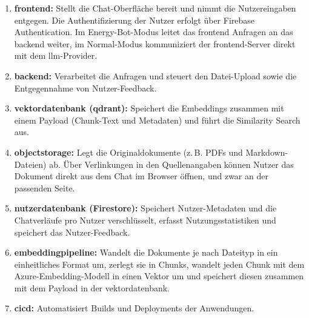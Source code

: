 \begin{enumerate}
    \item \textbf{\gls{frontend}:} Stellt die Chat-Oberfläche bereit und nimmt die Nutzereingaben entgegen. Die Authentifizierung der Nutzer erfolgt über Firebase Authentication. Im Energy-Bot-Modus leitet das \gls{frontend} Anfragen an das \gls{backend} weiter, im Normal-Modus kommuniziert der \gls{frontend}-Server direkt mit dem \ac{llm}-Provider.
    \item \textbf{\gls{backend}:} Verarbeitet die Anfragen und steuert den Datei-Upload sowie die Entgegennahme von Nutzer-Feedback.
    \item \textbf{\gls{vektordatenbank}{ }(\gls{qdrant}):} Speichert die Embeddings zusammen mit einem Payload (Chunk-Text und Metadaten) und führt die Similarity Search aus.
    \item \textbf{\gls{objectstorage}:} Legt die Originaldokumente (z.\,B. PDFs und Markdown-Dateien) ab. Über Verlinkungen in den Quellenangaben können Nutzer das Dokument direkt aus dem Chat im Browser öffnen, und zwar an der passenden Seite.
    \item \textbf{\gls{nutzerdatenbank}{ }(Firestore):}  Speichert Nutzer-Metadaten und die Chatverläufe pro Nutzer verschlüsselt, erfasst Nutzungsstatistiken und speichert das Nutzer-Feedback.
    \item \textbf{\gls{embeddingpipeline}:} Wandelt die Dokumente je nach Dateityp in ein einheitliches Format um, zerlegt sie in Chunks, wandelt jeden Chunk mit dem Azure-Embedding-Modell in einen Vektor um und speichert diesen zusammen mit dem Payload in der \gls{vektordatenbank}.
    \item \textbf{\gls{cicd}:} Automatisiert Builds und Deployments der Anwendungen.
\end{enumerate}

